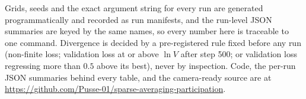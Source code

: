 \documentclass{article}
\theoremstyle{plain}
\begin{document}
Grids, seeds and the exact argument string for every run are generated
programmatically and recorded as run manifests, and the run-level JSON summaries
are keyed by the same names, so every number here is traceable to one command.
Divergence is decided by a pre-registered rule fixed before any run (non-finite
loss; validation loss at or above $\ln V$ after step 500; or validation loss
regressing more than $0.5$ above its best), never by inspection. Code, the per-run JSON summaries behind every
table, and the camera-ready source are at
\url{https://github.com/Pusse-01/sparse-averaging-participation}.
\end{document}

